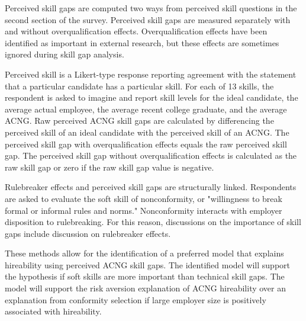 \documentclass[review]{elsarticle}
\begin{document}
Perceived skill gaps are computed two ways from perceived skill questions in the second section of the survey.
Perceived skill gaps are measured separately with and without overqualification effects.
Overqualification effects have been identified as important in external research\cite{green2007there, raybould2005over}, but these effects are sometimes ignored during skill gap analysis\cite{blake_2018}.

Perceived skill is a Likert-type response reporting agreement with the statement that a particular candidate has a particular skill.
For each of 13 skills, the respondent is asked to imagine and report skill levels for the ideal candidate,
the average actual employee,
the average recent college graduate,
and the average ACNG.
Raw perceived ACNG skill gaps are calculated by differencing the perceived skill of an ideal candidate with the perceived skill of an ACNG.
The perceived skill gap with overqualification effects equals the raw perceived skill gap.
The perceived skill gap without overqualification effects is calculated as the raw skill gap or zero if the raw skill gap value is negative.

Rulebreaker effects and perceived skill gaps are structurally linked.
Respondents are asked to evaluate the soft skill of nonconformity, or "willingness to break formal or informal rules and norms."
Nonconformity interacts with employer disposition to rulebreaking.
For this reason, discussions on the importance of skill gaps include discussion on rulebreaker effects.


These methods allow for the identification of a preferred model that explains hireability using perceived ACNG skill gaps.
The identified model will support the hypothesis if soft skills are more important than technical skill gaps. %
The model will support the risk aversion explanation of ACNG hireability over an explanation from conformity selection if large employer size is positively associated with hireability.
\end{document}

